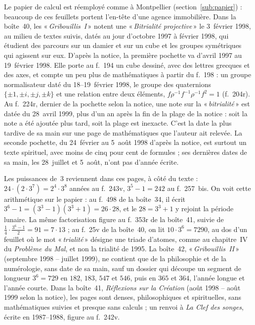 \documentclass[11pt]{amsart}
\newcommand{\q}[1]{«\,\textit{#1}\,»}
\begin{document}
Le papier de calcul est réemployé comme à Montpellier (section~\ref{sub:papier}) : beaucoup de ces feuillets portent l'en-tête d'une agence immobilière. Dans la boîte~40, les \q{Gribouillis~I} notent une \q{Bitrialité projective} le 3~février 1998, au milieu de textes suivis, datés au jour d'octobre 1997 à février 1998, qui étudient des parcours sur un damier et sur un cube et les groupes symétriques qui agissent sur eux. D'après la notice, la première pochette va d'avril 1997 au 19~février 1998. Elle porte au f.~194 un cube dessiné, avec des lettres grecques et des axes, et compte un peu plus de mathématiques à partir du f.~198 : un groupe normalisateur daté du 18--19~février 1998, le groupe des quaternions $\{\pm 1, \pm i, \pm j, \pm k\}$ et une relation entre deux éléments, $f \rho^{-1} f^{-1} \rho^{-1} f^2 = 1$ (f.~204r). Au f.~224r, dernier de la pochette selon la notice, une note sur la \q{bitrialité} est datée du 28~avril 1999, plus d'un an après la fin de la plage de la notice : soit la note a été ajoutée plus tard, soit la plage est inexacte. C'est la date la plus tardive de sa main sur une page de mathématiques que l'auteur ait relevée. La seconde pochette, du 24~février au 5~août 1998 d'après la notice, est surtout un texte spirituel, avec moins de cinq pour cent de formules ; ses dernières dates de sa main, les 28~juillet et 5~août, n'ont pas d'année écrite.

Les puissances de~3 reviennent dans ces pages, à côté du texte : $24 \cdot (2 \cdot 3^7) = 2^4 \cdot 3^8$ années au f.~243v, $3^5 - 1 = 242$ au f.~257~bis. On voit cette arithmétique sur le papier : au f.~498 de la boîte~34, il écrit $3^6 - 1 = (3^3 - 1)(3^3 + 1) = 26 \cdot 28$, et le $28 = 3^3 + 1$ y rejoint la période lunaire. La même factorisation figure au f.~353r de la boîte~41, suivie de $\tfrac14 \cdot \tfrac{3^6 - 1}{2} = 91 = 7 \cdot 13$ ; au f.~25v de la boîte~40, on lit $10 \cdot 3^6 = 7290$, au dos d'un feuillet où le mot \q{trialité} désigne une triade d'atomes, comme au chapitre~IV du \emph{Problème du Mal}, et non la trialité de 1995. La boîte~42, \q{Gribouillis~II} (septembre 1998 -- juillet 1999), ne contient que de la philosophie et de la numérologie, sans date de sa main, sauf un dossier qui découpe un segment de longueur $3^6 = 729$ en $182$, $183$, $547$ et $546$, puis en $365$ et $364$, l'année longue et l'année courte. Dans la boîte~41, \emph{Réflexions sur la Création} (août 1998 -- août 1999 selon la notice), les pages sont denses, philosophiques et spirituelles, sans mathématiques suivies et presque sans calculs ; un renvoi à \emph{La Clef des songes}, écrite en 1987--1988, figure au f.~242v.
\end{document}
